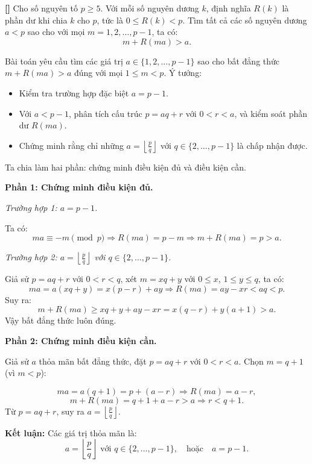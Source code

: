 \documentclass[../05-modular-arithmetic-a.tex]{subfiles}
\begin{document}
\begin{example*}\label{example:RMM-2015-P5}\textbf{[]}
	Cho số nguyên tố \( p \ge 5 \). Với mỗi số nguyên dương \( k \), định nghĩa \( R(k) \) là phần dư khi chia \( k \) cho \( p \), tức là \( 0 \le R(k) < p \).
	Tìm tất cả các số nguyên dương \( a < p \) sao cho với mọi \( m = 1, 2, \dots, p - 1 \), ta có:
	\[
		m + R(ma) > a.
	\]
\end{example*}

\begin{story*}
	Bài toán yêu cầu tìm các giá trị \( a \in \{1, 2, \dots, p-1\} \) sao cho bất đẳng thức \( m + R(ma) > a \) đúng với mọi \( 1 \le m < p \). Ý tưởng:
	\begin{itemize}[topsep=0pt, partopsep=0pt, itemsep=0pt]
		\item Kiểm tra trường hợp đặc biệt \( a = p - 1 \).
		\item Với \( a < p - 1 \), phân tích cấu trúc \( p = aq + r \) với \( 0 < r < a \), và kiểm soát phần dư \( R(ma) \).
		\item Chứng minh rằng chỉ những \( a = \left\lfloor \tfrac{p}{q} \right\rfloor \) với \( q \in \{2, \dots, p-1\} \) là chấp nhận được.
	\end{itemize}
\end{story*}

\bigbreak

\begin{soln}\footnotemark
	Ta chia làm hai phần: chứng minh điều kiện đủ và điều kiện cần.

	\textbf{Phần 1: Chứng minh điều kiện đủ.}

	\textit{Trường hợp 1: \( a = p - 1 \).}

	Ta có:
	\[
		ma \equiv -m \pmod{p} \Rightarrow R(ma) = p - m \Rightarrow m + R(ma) = p > a.
	\]

	\textit{Trường hợp 2: \( a = \left\lfloor \frac{p}{q} \right\rfloor \) với \( q \in \{2, \dots, p - 1\} \).}

	Giả sử \( p = aq + r \) với \( 0 < r < q \), xét \( m = xq + y \) với \( 0 \le x \), \( 1 \le y \le q \), ta có:
	\[
		ma = a(xq + y) = x(p - r) + ay \Rightarrow R(ma) = ay - xr < aq < p.
	\]
	Suy ra:
	\[
		m + R(ma) \ge xq + y + ay - xr = x(q - r) + y(a + 1) > a.
	\]
	Vậy bất đẳng thức luôn đúng.

	\textbf{Phần 2: Chứng minh điều kiện cần.}

	Giả sử \( a \) thỏa mãn bất đẳng thức, đặt \( p = aq + r \) với \( 0 < r < a \). Chọn \( m = q + 1 \) (vì \( m < p \)):

	\[
		ma = a(q + 1) = p + (a - r) \Rightarrow R(ma) = a - r,
	\]
	\[
		m + R(ma) = q + 1 + a - r > a \Rightarrow r < q + 1.
	\]
	Từ \( p = aq + r \), suy ra \( a = \left\lfloor \frac{p}{q} \right\rfloor \).

	\textbf{Kết luận:} Các giá trị thỏa mãn là:
	\[
		\boxed{
			a = \left\lfloor \frac{p}{q} \right\rfloor \text{ với } q \in \{2, \dots, p - 1\}, \quad \text{hoặc} \quad a = p - 1.
		}
	\]
\end{soln}

\end{document}
